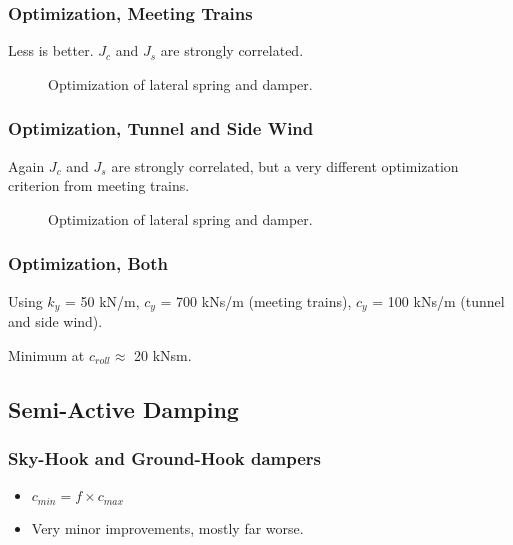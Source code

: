 \documentclass{beamer}
\begin{document}
\begin{frame}
 \frametitle{Optimization, Meeting Trains}
 Less is better. $J_c$ and $J_s$ are strongly correlated.
 \begin{figure}
  \centering
  \caption{Optimization of lateral spring and damper.}
 \end{figure}
\end{frame}

\begin{frame}
 \frametitle{Optimization, Tunnel and Side Wind}
 Again $J_c$ and $J_s$ are strongly correlated, but a very different optimization criterion from meeting trains.
 \begin{figure}
  \centering
  \caption{Optimization of lateral spring and damper.}
 \end{figure}
\end{frame}

\begin{frame}
 \frametitle{Optimization, Both}
 Using $k_y$ = 50 kN/m, $c_y$ = 700 kNs/m (meeting trains), $c_y$ = 100 kNs/m (tunnel and side wind).
 \begin{figure}
  \centering
 \end{figure}
 Minimum at $c_{roll}\approx$ 20 kNsm.
\end{frame}

\subsection{Semi-Active Damping}
\begin{frame}
 \frametitle{Sky-Hook and Ground-Hook dampers}
 \begin{figure}
 \centering
 \end{figure}
 \begin{itemize}
  \item $c_{min}=f\times c_{max}$
  \item Very minor improvements, mostly far worse.
 \end{itemize}
\end{frame}
\end{document}
